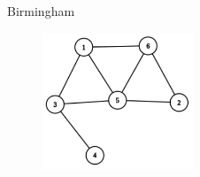 \begin{statement}[
  problempoints=70,
  timelimit=1 sekunda,
  memorylimit=512 MiB,
]{Birmingham}
\setlength\intextsep{-0.5cm}
\begin{figure}
\centering
\includegraphics[width=0.4\textwidth]{graph.png}
\end{figure}

\end{statement}

